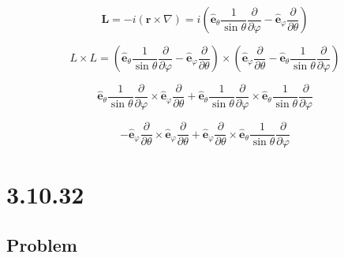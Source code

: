 \documentclass[12pt]{article}
\begin{document}
\[
    \textbf{L} = -i \left(\textbf{r} \times \nabla\right)
    = i
    \left(
    \hat{\textbf{e}}_\theta \frac{1}{\sin{\theta}} \frac{\partial}{\partial \varphi}
    - \hat{\textbf{e}}_\varphi \frac{\partial}{\partial \theta}
    \right)
\]

\[
    L \times L =
    \left(
    \hat{\textbf{e}}_\theta \frac{1}{\sin{\theta}} \frac{\partial}{\partial \varphi}
    - \hat{\textbf{e}}_\varphi \frac{\partial}{\partial \theta}
    \right) \times
    \left(
    \hat{\textbf{e}}_\varphi \frac{\partial}{\partial \theta}
    - \hat{\textbf{e}}_\theta \frac{1}{\sin{\theta}} \frac{\partial}{\partial \varphi}
    \right)
\]

\[
    \hat{\textbf{e}}_\theta \frac{1}{\sin{\theta}} \frac{\partial}{\partial \varphi}
    \times \hat{\textbf{e}}_\varphi \frac{\partial}{\partial \theta}
    + \hat{\textbf{e}}_\theta \frac{1}{\sin{\theta}} \frac{\partial}{\partial \varphi}
    \times \hat{\textbf{e}}_\theta \frac{1}{\sin{\theta}} \frac{\partial}{\partial \varphi}
\]

\[
    - \hat{\textbf{e}}_\varphi \frac{\partial}{\partial \theta}
    \times \hat{\textbf{e}}_\varphi \frac{\partial}{\partial \theta}
    + \hat{\textbf{e}}_\varphi \frac{\partial}{\partial \theta}
    \times \hat{\textbf{e}}_\theta \frac{1}{\sin{\theta}} \frac{\partial}{\partial \varphi}
\] %



\section{3.10.32}

\subsection{Problem}
\end{document}
